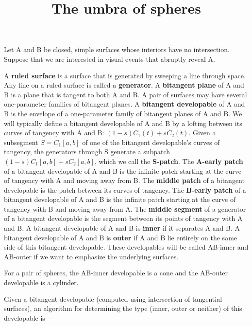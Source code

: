 \documentclass[12pt]{article}
\title{The umbra of spheres}
\begin{document}
\maketitle


Let A and B be closed, simple surfaces whose interiors have no intersection.
Suppose that we are interested in visual events that abruptly reveal A.

\begin{defn2}
A {\bf ruled surface} is a surface that is generated by sweeping a line through space.
Any line on a ruled surface is called a {\bf generator}.
A {\bf bitangent plane} of A and B is a plane that is tangent to both A and B.
A pair of surfaces may have several one-parameter families of bitangent planes.
A {\bf bitangent developable} of A and B is the envelope of a one-parameter family of 
bitangent planes of A and B.
We will typically define a bitangent developable of A and B by a lofting between 
its curves of tangency with A and B: $(1-s)C_1(t) + sC_2(t)$.
Given a subsegment $S = C_1[a,b]$ of one of the bitangent developable's curves of 
tangency,
the generators through S generate a subpatch $(1-s)C_1[a,b] + sC_2[a,b]$, 
which we call the {\bf S-patch}.
The {\bf A-early patch} of a bitangent developable of A and B is the infinite patch 
starting at the curve of tangency with A and moving away from B.
The {\bf middle patch} of a bitangent developable is the patch between its curves 
of tangency.
The {\bf B-early patch} of a bitangent developable of A and B is the infinite patch 
starting at the curve of tangency with B and moving away from A.
The {\bf middle segment} of a generator of a bitangent developable is the segment between 
its points of tangency with A and B.
A bitangent developable of A and B is {\bf inner} if it separates A and B.
A bitangent developable of A and B is {\bf outer} if A and B lie entirely on the same
side of this bitangent developable.
These developables will be called AB-inner and AB-outer if we want to emphasize
the underlying surfaces.
\end{defn2}

For a pair of spheres, the AB-inner developable is a cone and the AB-outer developable
is a cylinder.

Given a bitangent developable (computed using intersection of tangential surfaces), 
an algorithm for determining the type (inner, outer or neither) of this developable is ---
\end{document}
